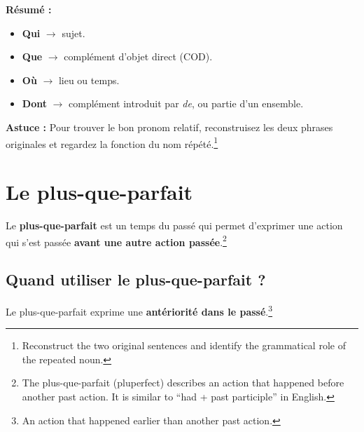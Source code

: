 \documentclass[math,code]{amznotes}
\theoremstyle{remark}
\begin{document}
\begin{notebox}
\textbf{Résumé :}

\begin{itemize}
    \item \textbf{Qui} $\rightarrow$ sujet.
    \item \textbf{Que} $\rightarrow$ complément d'objet direct (COD).
    \item \textbf{Où} $\rightarrow$ lieu ou temps.
    \item \textbf{Dont} $\rightarrow$ complément introduit par \textit{de}, ou partie d'un ensemble.
\end{itemize}

\textbf{Astuce :} Pour trouver le bon pronom relatif, reconstruisez les deux phrases originales et regardez la fonction du nom répété.\footnote{Reconstruct the two original sentences and identify the grammatical role of the repeated noun.}
\end{notebox}


\section{Le plus-que-parfait}

Le \textbf{plus-que-parfait} est un temps du passé qui permet d'exprimer une action qui s'est passée \textbf{avant une autre action passée}.\footnote{The plus-que-parfait (pluperfect) describes an action that happened before another past action. It is similar to ``had + past participle'' in English.}

\subsection*{Quand utiliser le plus-que-parfait ?}

Le plus-que-parfait exprime une \textbf{antériorité dans le passé}.\footnote{An action that happened earlier than another past action.}
\end{document}
